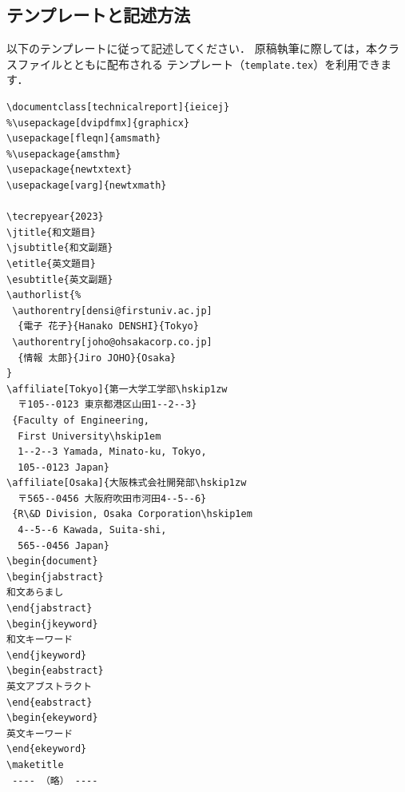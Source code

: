 \documentclass[technicalreport]{ieicej}
\begin{document}
\subsection{テンプレートと記述方法}
\label{sec:technicalreport}

以下のテンプレートに従って記述してください．
原稿執筆に際しては，本クラスファイルとともに配布される
テンプレート（\texttt{template.tex}）を利用できます．

\begin{verbatim}
\documentclass[technicalreport]{ieicej}
%\usepackage[dvipdfmx]{graphicx}
\usepackage[fleqn]{amsmath}
%\usepackage{amsthm}
\usepackage{newtxtext}
\usepackage[varg]{newtxmath}

\tecrepyear{2023}
\jtitle{和文題目}
\jsubtitle{和文副題}
\etitle{英文題目}
\esubtitle{英文副題}
\authorlist{%
 \authorentry[densi@firstuniv.ac.jp]
  {電子 花子}{Hanako DENSHI}{Tokyo}
 \authorentry[joho@ohsakacorp.co.jp]
  {情報 太郎}{Jiro JOHO}{Osaka}
}
\affiliate[Tokyo]{第一大学工学部\hskip1zw
  〒105--0123 東京都港区山田1--2--3}
 {Faculty of Engineering, 
  First University\hskip1em
  1--2--3 Yamada, Minato-ku, Tokyo,
  105--0123 Japan}
\affiliate[Osaka]{大阪株式会社開発部\hskip1zw
  〒565--0456 大阪府吹田市河田4--5--6}
 {R\&D Division, Osaka Corporation\hskip1em
  4--5--6 Kawada, Suita-shi,
  565--0456 Japan}
\begin{document}
\begin{jabstract}
和文あらまし
\end{jabstract}
\begin{jkeyword}
和文キーワード
\end{jkeyword}
\begin{eabstract}
英文アブストラクト
\end{eabstract}
\begin{ekeyword}
英文キーワード
\end{ekeyword}
\maketitle
 ---- （略） ----
\end{verbatim}
\end{document}
